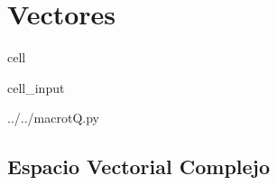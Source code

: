 \documentclass[letterpaper,10pt,english]{jupyterBook}
\begin{document}
\section{Vectores}
\label{\detokenize{docs/Part_01_Formalismo/Chapter_01_02_Formalismo_matem_xe1tico/01_02_Vectores_myst:vectores}}\label{\detokenize{docs/Part_01_Formalismo/Chapter_01_02_Formalismo_matem_xe1tico/01_02_Vectores_myst::doc}}
\sphinxAtStartPar


\begin{sphinxuseclass}{cell}\begin{sphinxVerbatimInput}

\begin{sphinxuseclass}{cell_input}
\begin{sphinxVerbatim}[commandchars=\\\{\}]
 ../../macro\PYGZus{}tQ.py
 
   

   
   
   
   
\end{sphinxVerbatim}

\end{sphinxuseclass}\end{sphinxVerbatimInput}

\end{sphinxuseclass}

\subsection{Espacio Vectorial Complejo}
\label{\detokenize{docs/Part_01_Formalismo/Chapter_01_02_Formalismo_matem_xe1tico/01_02_Vectores_myst:espacio-vectorial-complejo}}
\end{document}
